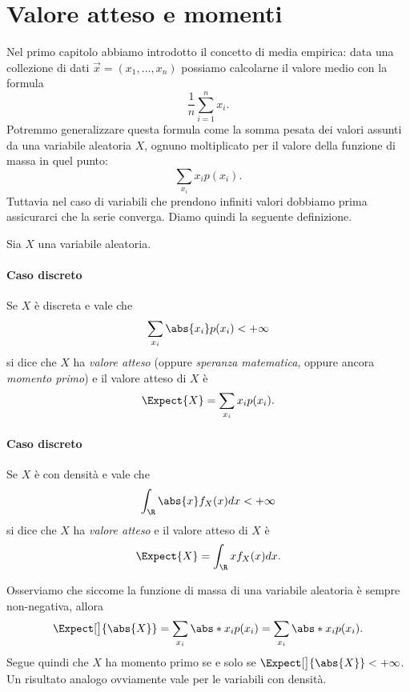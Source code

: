 \section{Valore atteso e momenti}

Nel primo capitolo abbiamo introdotto il concetto di media empirica: data una collezione di dati $\vec x = (x_1, \dots, x_n)$ possiamo calcolarne il valore medio con la formula \[
    \frac1n \sum_{i = 1}^n x_i. 
\] Potremmo generalizzare questa formula come la somma pesata dei valori assunti da una variabile aleatoria $X$, ognuno moltiplicato per il valore della funzione di massa in quel punto: \[
    \sum_{x_i} x_i p(x_i). 
\] Tuttavia nel caso di variabili che prendono infiniti valori dobbiamo prima assicurarci che la serie converga. Diamo quindi la seguente definizione.

\begin{definition}
     Sia $X$ una variabile aleatoria.
    \paragraph{Caso discreto} Se $X$ è discreta e vale che \[
        \sum_{x_i} \abs{x_i}p(x_i) < +\infty
    \] si dice che $X$ ha \emph{valore atteso} (oppure \emph{speranza matematica}, oppure ancora \emph{momento primo}) e il valore atteso di $X$ è \[
        \Expect{X} = \sum_{x_i} x_ip(x_i).    
    \]
    \paragraph{Caso discreto} Se $X$ è con densità e vale che \[
        \int_\R \abs{x}f_X(x)dx < +\infty
    \] si dice che $X$ ha \emph{valore atteso} e il valore atteso di $X$ è \[
        \Expect{X} = \int_\R xf_X(x)dx.    
    \]
\end{definition}

\begin{remark}
    Osserviamo che siccome la funzione di massa di una variabile aleatoria è sempre non-negativa, allora \[
        \Expect[\big]{\abs{X}} = \sum_{x_i} \abs*{x_ip(x_i)} = \sum_{x_i} \abs*{x_i}p(x_i).   
    \] Segue quindi che $X$ ha momento primo se e solo se $\Expect[\big]{\abs{X}} < +\infty$. Un risultato analogo ovviamente vale per le variabili con densità.
\end{remark}